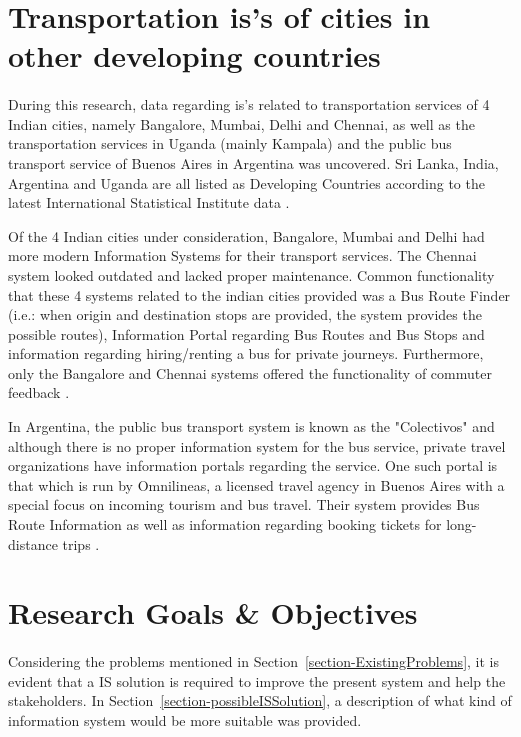 \section{Transportation \acrshort{is}'s of cities in other developing countries}

\paragraph{} During this research, data regarding \acrshort{is}'s related to transportation services of 4 Indian cities, namely Bangalore, Mumbai, Delhi and Chennai, as well as the transportation services in Uganda (mainly Kampala) and the public bus transport service of Buenos Aires in Argentina was uncovered. Sri Lanka, India, Argentina and Uganda are all listed as Developing Countries according to the latest International Statistical Institute data \cite{ISI2013}.

Of the 4 Indian cities under consideration, Bangalore, Mumbai and Delhi had more modern Information Systems for their transport services. The Chennai system looked outdated and lacked proper maintenance. Common functionality that these 4 systems related to the indian cities provided was a Bus Route Finder (i.e.: when origin and destination stops are provided, the system provides the possible routes), Information Portal regarding Bus Routes and Bus Stops and information regarding hiring/renting a bus for private journeys. Furthermore, only the Bangalore and Chennai systems offered the functionality of commuter feedback \cite{BMTC1997, BEST1995, DTC2012, MTC2001}.

In Argentina, the public bus transport system is known as the "Colectivos" and although there is no proper information system for the bus service, private travel organizations have information portals regarding the service. One such portal is that which is run by Omnilineas, a licensed travel agency in Buenos Aires with a special focus on incoming tourism and bus travel. Their system provides Bus Route Information as well as information regarding booking tickets for long-distance trips \cite{Omnilineas2013}.



\section{Research Goals \& Objectives}
\label{section-ResearchGoalsAndObjectives}

\paragraph{ } Considering the problems mentioned in Section~\ref{section-ExistingProblems}, 
it is evident that a IS solution is required to improve the present system and help the stakeholders. In Section~\ref{section-possibleISSolution}, a description of what kind of information system would be more suitable was provided.

